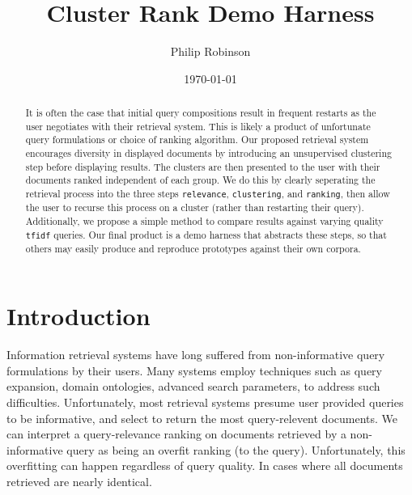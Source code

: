 \documentclass[8pt,twocolumn]{extarticle}
\title{Cluster Rank Demo Harness}
\date{\today}
\author{Philip Robinson}
\affil{Oregon Health Sciences University}
\def\tfidf{\texttt{tfidf}\xspace}
\begin{document}
\maketitle
{}
\begin{abstract}
  It is often the case that initial query compositions result in frequent restarts as
  the user negotiates with their retrieval system. This is likely a product of unfortunate
  query formulations or choice of ranking algorithm. Our proposed retrieval system
  encourages diversity in displayed documents by introducing an unsupervised clustering
  step before displaying results. The clusters are then presented to the user with their
  documents ranked independent of each group. We do this by clearly seperating the
  retrieval process into the three steps \texttt{relevance}, \texttt{clustering}, and
  \texttt{ranking}, then allow the user to recurse this process on a cluster (rather
  than restarting their query). Additionally, we propose a simple method to
  compare results against varying quality \tfidf queries. Our final product is a demo
  harness that abstracts these steps, so that others may easily produce and reproduce
  prototypes against their own corpora.
\end{abstract}

\section{Introduction}
Information retrieval systems have long suffered from non-informative query formulations
by their users. Many systems employ techniques such as query expansion, domain ontologies,
advanced search parameters, to address such difficulties. Unfortunately, most retrieval
systems presume user provided queries to be informative, and select to return the most
query-relevent documents. We can interpret a query-relevance ranking on documents retrieved
by a non-informative query as being an overfit ranking (to the query). Unfortunately, this
overfitting can happen regardless of query quality. In cases where all documents retrieved
are nearly identical.
\end{document}
